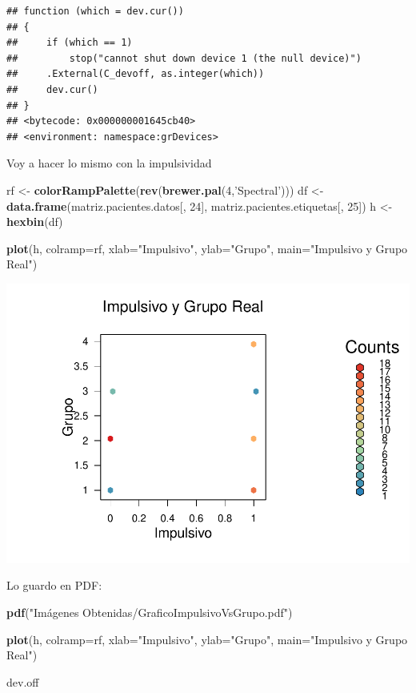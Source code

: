 \documentclass[]{article}
\newenvironment{Shaded}{\begin{snugshade}}{\end{snugshade}}
\newcommand{\DataTypeTok}[1]{\textcolor[rgb]{0.13,0.29,0.53}{#1}}
\newcommand{\DecValTok}[1]{\textcolor[rgb]{0.00,0.00,0.81}{#1}}
\newcommand{\KeywordTok}[1]{\textcolor[rgb]{0.13,0.29,0.53}{\textbf{#1}}}
\newcommand{\NormalTok}[1]{#1}
\newcommand{\StringTok}[1]{\textcolor[rgb]{0.31,0.60,0.02}{#1}}
\begin{document}
\begin{verbatim}
## function (which = dev.cur()) 
## {
##     if (which == 1) 
##         stop("cannot shut down device 1 (the null device)")
##     .External(C_devoff, as.integer(which))
##     dev.cur()
## }
## <bytecode: 0x000000001645cb40>
## <environment: namespace:grDevices>
\end{verbatim}

Voy a hacer lo mismo con la impulsividad

\begin{Shaded}
\begin{Highlighting}[]
\NormalTok{rf <-}\StringTok{ }\KeywordTok{colorRampPalette}\NormalTok{(}\KeywordTok{rev}\NormalTok{(}\KeywordTok{brewer.pal}\NormalTok{(}\DecValTok{4}\NormalTok{,}\StringTok{'Spectral'}\NormalTok{)))}
\NormalTok{df <-}\StringTok{ }\KeywordTok{data.frame}\NormalTok{(matriz.pacientes.datos[, }\DecValTok{24}\NormalTok{], matriz.pacientes.etiquetas[, }\DecValTok{25}\NormalTok{])}
\NormalTok{h <-}\StringTok{ }\KeywordTok{hexbin}\NormalTok{(df)}

\KeywordTok{plot}\NormalTok{(h, }\DataTypeTok{colramp=}\NormalTok{rf, }\DataTypeTok{xlab=}\StringTok{"Impulsivo"}\NormalTok{, }\DataTypeTok{ylab=}\StringTok{"Grupo"}\NormalTok{, }\DataTypeTok{main=}\StringTok{"Impulsivo y Grupo Real"}\NormalTok{)}
\end{Highlighting}
\end{Shaded}

\includegraphics{codigo_files/figure-latex/grafico_impulsivo_grupo-1.pdf}

Lo guardo en PDF:

\begin{Shaded}
\begin{Highlighting}[]
\KeywordTok{pdf}\NormalTok{(}\StringTok{"Imágenes Obtenidas/GraficoImpulsivoVsGrupo.pdf"}\NormalTok{)}

\KeywordTok{plot}\NormalTok{(h, }\DataTypeTok{colramp=}\NormalTok{rf, }\DataTypeTok{xlab=}\StringTok{"Impulsivo"}\NormalTok{, }\DataTypeTok{ylab=}\StringTok{"Grupo"}\NormalTok{, }\DataTypeTok{main=}\StringTok{"Impulsivo y Grupo Real"}\NormalTok{)}

\NormalTok{dev.off}
\end{Highlighting}
\end{Shaded}
\end{document}

